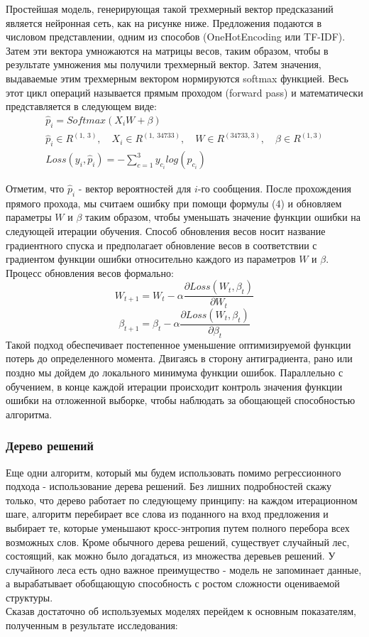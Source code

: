 \documentclass{article}
\begin{document}
Простейшая модель, генерирующая такой трехмерный вектор предсказаний является нейронная сеть, как на рисунке ниже. Предложения подаются в числовом представлении, одним из способов (OneHotEncoding или TF-IDF). Затем эти вектора умножаются на матрицы весов, таким образом, чтобы в результате умножения мы получили трехмерный вектор. Затем значения, выдаваемые этим трехмерным вектором нормируются softmax функцией. Весь этот цикл операций называется прямым проходом (forward pass) и математически представляется в следующем виде:
\begin{gather}
	\hat{p}_i = Softmax(X_iW + \beta) \\
	\hat{p}_i \in R^{(1, ~3)}, \quad X_i \in R^{(1, ~34733)} , \quad W \in R^{(34733, 3)}, \quad \beta\in R^{(1, 3)}\\
	Loss(y_i, \hat{p}_i) = -\sum_{c=1}^{3} y_{c_i} log(\hat{p}_{c_i})
\end{gather}

Отметим, что $\hat{p}_i$ - вектор вероятностей для $i$-го сообщения. После прохождения прямого прохода, мы считаем ошибку при помощи формулы (4) и обновляем параметры $W$ и $\beta$ таким образом, чтобы уменьшать значение функции ошибки на следующей итерации обучения. Способ обновления весов носит название градиентного спуска и предполагает обновление весов в соответствии с градиентом функции ошибки относительно каждого из параметров $W$ и $\beta$.
\newpage
Процесс обновления весов формально:
\[ W_{t+1} = W_{t} - \alpha \frac{\partial Loss(W_t, \beta_t)}{\partial W_t} \]
\[ \beta_{t+1} = \beta_{t} - \alpha \frac{\partial Loss(W_t, \beta_t)}{\partial \beta_t} \]
 Такой подход обеспечивает постепенное уменьшение оптимизируемой функции потерь до определенного момента. Двигаясь в сторону антиградиента, рано или поздно мы дойдем до локального минимума функции ошибок. Параллельно с обучением, в конце каждой итерации происходит контроль значения функции ошибки на отложенной выборке, чтобы наблюдать за обощающей способностью алгоритма. 

 \subsubsection*{Дерево решений}
Еще одни алгоритм, который мы будем использовать помимо регрессионного подхода - использование дерева решений. Без лишних подробностей скажу только, что дерево работает по следующему принципу: на каждом итерационном шаге, алгоритм перебирает все слова из поданного на вход предложения и выбирает те, которые уменьшают кросс-энтропия путем полного перебора всех возможных слов. Кроме обычного дерева решений, существует случайный лес, состоящий, как можно было догадаться, из множества деревьев решений. У случайного леса есть одно важное преимущество - модель не запоминает данные, а вырабатывает обобщающую способность с ростом сложности оцениваемой структуры. \\ 
Сказав достаточно об используемых моделях перейдем к основным показателям, полученным в результате исследования:
\end{document}
